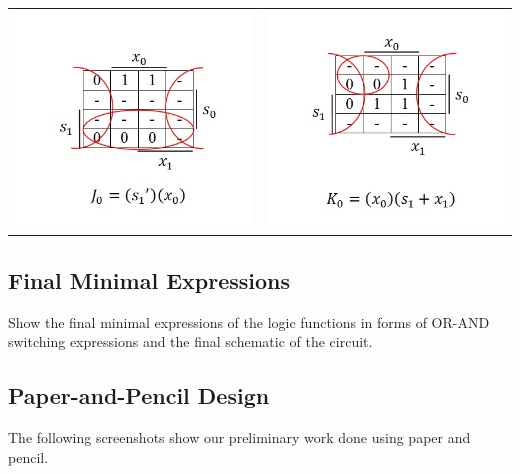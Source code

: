 \documentclass{article}
\begin{document}
\begin{table}[h!]
\begin{tabular}{ c c }
\centering
\includegraphics[scale=0.6]{J0-KMap} &
\includegraphics[scale=0.6]{K0-KMap} \\
\end{tabular}
\end{table}

\pagebreak


\subsection{Final Minimal Expressions}
Show the final minimal expressions of the logic functions in forms of OR-AND 
switching expressions and the final schematic of the circuit.


\subsection{Paper-and-Pencil Design}
The following screenshots show our preliminary work done using paper and 
pencil.

\end{document}
